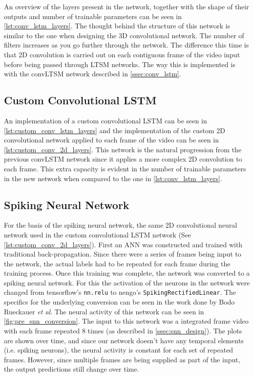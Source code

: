 An overview of the layers present in the network, together with the shape of their outputs and number of trainable parameters can be seen in \cref{lst:conv_lstm_layers}. The thought behind the structure of this network is similar to the one when designing the 3D convolutional network. The number of filters increases as you go further through the network. The difference this time is that 2D convolution is carried out on each contiguous frame of the video input before being passed through LTSM networks. The way this is implemented is with the convLTSM network described in \cref{ssec:conv_lstm}.

\subsection{Custom Convolutional LSTM}

An implementation of a custom convolutional LSTM can be seen in \cref{lst:custom_conv_lstm_layers} and the implementation of the custom 2D convolutional network applied to each frame of the video can be seen in \cref{lst:custom_conv_2d_layers}. This network is the natural progression from the previous convLSTM network since it applies a more complex 2D convolution to each frame. This extra capacity is evident in the number of trainable parameters in the new network when compared to the one in \cref{lst:conv_lstm_layers}.

\subsection{Spiking Neural Network}

For the basis of the spiking neural network, the same 2D convolutional neural network used in the custom convolutional LSTM network (See \cref{lst:custom_conv_2d_layers}). First an ANN was constructed and trained with traditional back-propagation. Since there were a series of frames being input to the network, the actual labels had to be repeated for each frame during the training process. Once this training was complete, the network was converted to a spiking neural network. For this the activation of the neurons in the network were changed from tensorflow's \lstinline{nn.relu} to nengo's \lstinline{SpikingRectifiedLinear}. The specifics for the underlying conversion can be seen in the work done by Bodo Rueckauer \textit{et al}\cite{Ann2Snn}. The neural activity of this network can be seen in \cref{fig:pre_snn_conversion}. The input to this network was a integrated frame video with each frame repeated 8 times (as described in \cref{ssec:snn_design}). The plots are shown over time, and since our network doesn't have any temporal elements (i.e. spiking neurons), the neural activity is constant for each set of repeated frames. However, since multiple frames are being supplied as part of the input, the output predictions still change over time.

